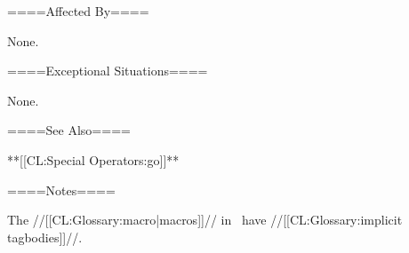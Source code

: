 ====Affected By====

None.

====Exceptional Situations====

None.

====See Also====

**[[CL:Special Operators:go]]**

====Notes====

The //[[CL:Glossary:macro|macros]]// in \thenextfigure\ have //[[CL:Glossary:implicit tagbodies]]//.


